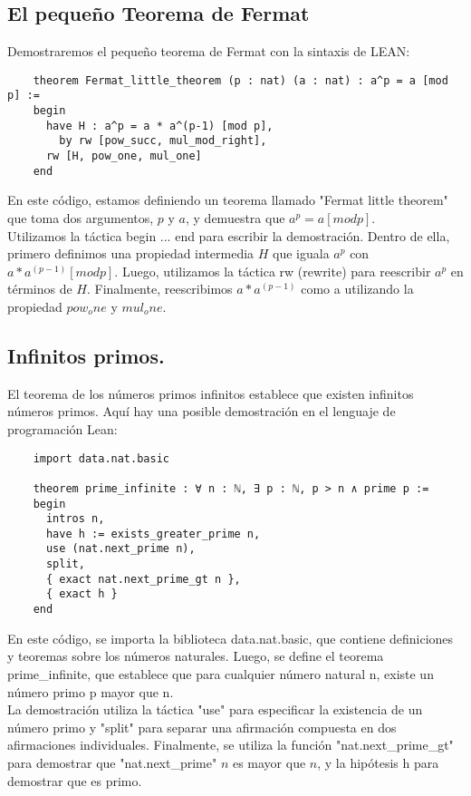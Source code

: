 \documentclass{article}
\begin{document}
\subsection{El pequeño Teorema de Fermat}
Demostraremos el pequeño teorema de Fermat con la sintaxis de LEAN:
\begin{lstlisting}
    theorem Fermat_little_theorem (p : nat) (a : nat) : a^p = a [mod p] :=
    begin
      have H : a^p = a * a^(p-1) [mod p],
        by rw [pow_succ, mul_mod_right],
      rw [H, pow_one, mul_one]
    end
\end{lstlisting}
En este código, estamos definiendo un teorema llamado "Fermat little
theorem" que toma dos argumentos, $p$ y $a$, y demuestra que $a^p = a [mod
			p]$.\\
Utilizamos la táctica begin ... end para escribir la demostración. Dentro
de ella, primero definimos una propiedad intermedia $H$ que iguala $a^p$
con $a * a^(p-1) [mod p]$. Luego, utilizamos la táctica rw (rewrite) para
reescribir $a^p$ en términos de $H$. Finalmente, reescribimos $a * a^(p-1)$
como a utilizando la propiedad $pow_one$ y $mul_one$.

\subsection{Infinitos primos.}
El teorema de los números primos infinitos establece que existen infinitos
números primos. Aquí hay una posible demostración en el lenguaje de
programación Lean:
\begin{lstlisting}
    import data.nat.basic

    theorem prime_infinite : ∀ n : ℕ, ∃ p : ℕ, p > n ∧ prime p :=
    begin
      intros n,
      have h := exists_greater_prime n,
      use (nat.next_prime n),
      split,
      { exact nat.next_prime_gt n },
      { exact h }
    end
\end{lstlisting}
En este código, se importa la biblioteca data.nat.basic, que contiene
definiciones y teoremas sobre los números naturales. Luego, se define el
teorema prime\_infinite, que establece que para cualquier número natural
n, existe un número primo p mayor que n.\\

La demostración utiliza la táctica "use" para especificar la existencia de
un número primo y "split" para separar una afirmación compuesta en dos
afirmaciones individuales. Finalmente, se utiliza la función
"nat.next\_prime\_gt" para demostrar que "nat.next\_prime" $n$ es mayor
que $n$, y la hipótesis h para demostrar que es primo.
\end{document}
